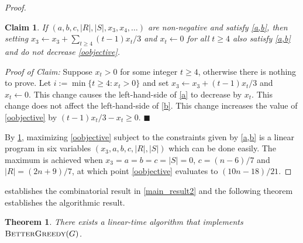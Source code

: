 \documentclass{article}
\newtheorem{thm}{Theorem}
\newtheorem{clm}{Claim}
\newenvironment{clmproof}{\noindent\emph{Proof of Claim:}}{\hfill{$\blacksquare$}\par}
\theoremstyle{definition}
\begin{document}
\begin{proof}
  \begin{clm}\label{simplify}
    If $(a,b,c,|R|,|S|,x_3,x_4,\ldots)$ are non-negative and satisfy \cref{a,b}, then setting $x_3\gets x_3+\sum_{t\ge 4}(t-1)x_t/3$ and $x_t\gets 0$ for all $t\ge 4$ also satisfy \cref{a,b} and do not decrease \cref{oobjective}.
  \end{clm}

  \begin{clmproof}
    Suppose $x_t>0$ for some integer $t\ge 4$, otherwise there is nothing to prove.  Let $i:=\min\{t\ge 4: x_t>0\}$ and set $x_3\gets x_3+(t-1)x_t/3$ and $x_t\gets 0$. This change causes the left-hand-side of \cref{a} to decrease by $x_t$. This change does not affect the left-hand-side of \cref{b}.  This change increases the value of \cref{oobjective} by $(t-1)x_t/3-x_t\ge 0$.
  \end{clmproof}

  By \cref{simplify}, maximizing \cref{oobjective} subject to the constraints given by \cref{a,b} is a linear program in six variables $(x_3,a,b,c,|R|,|S|)$ which can be done easily.  The maximum is achieved when $x_3=a=b=c=|S|=0$, $c=(n-6)/7$ and $|R|=(2n+9)/7$, at which point \cref{oobjective} evaluates to $(10n-18)/21$.
\end{proof}

 establishes the combinatorial result in \cref{main_result2} and the following theorem establishes the algorithmic result.

\begin{thm}
    There exists a linear-time algorithm that implements $\textsc{BetterGreedy}(G)$.
\end{thm}
\end{document}
